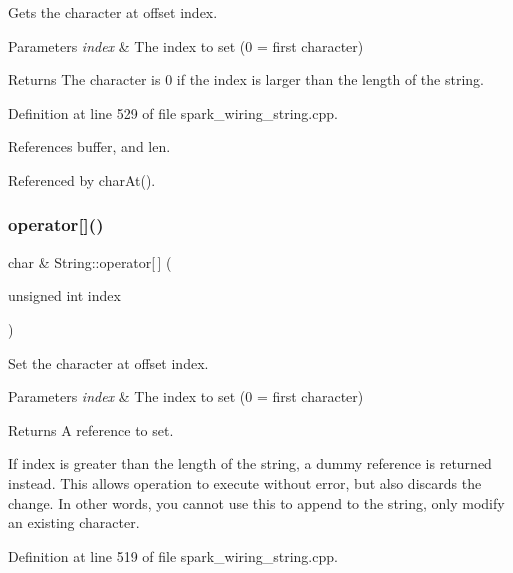 Gets the character at offset index. 


\begin{DoxyParams}{Parameters}
{\em index} & The index to set (0 = first character)\\
\hline
\end{DoxyParams}
\begin{DoxyReturn}{Returns}
The character is 0 if the index is larger than the length of the string. 
\end{DoxyReturn}


Definition at line 529 of file spark\+\_\+wiring\+\_\+string.\+cpp.



References buffer, and len.



Referenced by char\+At().

\mbox{\label{class_string_a92a0681d0031d7e99c12c245cc22367e}} 
\subsubsection{\texorpdfstring{operator[]()}{operator[]()}\hspace{0.1cm}{\footnotesize\ttfamily [2/2]}}
{\footnotesize\ttfamily char \& String\+::operator\mbox{[}$\,$\mbox{]} (\begin{DoxyParamCaption}\item[{unsigned int}]{index }\end{DoxyParamCaption})}



Set the character at offset index. 


\begin{DoxyParams}{Parameters}
{\em index} & The index to set (0 = first character)\\
\hline
\end{DoxyParams}
\begin{DoxyReturn}{Returns}
A reference to set.
\end{DoxyReturn}
If index is greater than the length of the string, a dummy reference is returned instead. This allows operation to execute without error, but also discards the change. In other words, you cannot use this to append to the string, only modify an existing character. 

Definition at line 519 of file spark\+\_\+wiring\+\_\+string.\+cpp.



